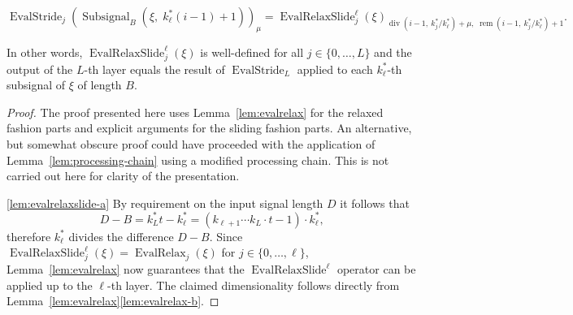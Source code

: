 \documentclass[journal]{IEEEtran}
\newcommand{\ROI}{B}
\newcommand{\discint}[2]{\{#1,\dotsc,#2\}}
\newcommand{\inint}[2]{\in\discint{#1}{#2}}
\DeclareMathOperator{\Subsignal}{Subsignal}
\DeclareMathOperator{\EvalStride}{EvalStride}
\renewcommand{\div}[2]{\operatorname{div}(#1,\ #2)}
\newcommand{\rem}[2]{\operatorname{rem}(#1,\ #2)}
\DeclareMathOperator{\EvalRelax}{EvalRelax}
\DeclareMathOperator{\EvalRelaxSlide}{EvalRelaxSlide}
\begin{document}
\begin{lemma}
\begin{enumerate}
        \begin{displaymath}
          \EvalStride_j(\Subsignal_\ROI(\xi,\; k_\ell^*(i - 1) + 1))_\mu
          = \EvalRelaxSlide_j^\ell(\xi)_{\div{i - 1}{k_j^* / k_\ell^*} + \mu,\;\rem{i - 1}{k_j^* / k_\ell^*} + 1}\text{.}
        \end{displaymath}
\end{enumerate}
In other words, $\EvalRelaxSlide_j^\ell(\xi)$ is well-defined for all $j\inint{0}{L}$ and the output of the $L$-th layer equals the result of $\EvalStride_L$ applied to each $k_\ell^*$-th subsignal of $\xi$ of length $\ROI$.
\end{lemma}\begin{proof}
The proof presented here uses Lemma~\ref{lem:evalrelax} for the relaxed fashion parts and explicit arguments for the sliding fashion parts.
An alternative, but somewhat obscure proof could have proceeded with the application of Lemma~\ref{lem:processing-chain} using a modified processing chain.
This is not carried out here for clarity of the presentation.

\ref{lem:evalrelaxslide-a}
By requirement on the input signal length $D$ it follows that
\begin{displaymath}
  D - \ROI
  = k_L^*t - k_\ell^*
  = (k_{\ell + 1}\cdots k_L\cdot t - 1)\cdot k_\ell^*\text{,}
\end{displaymath}
therefore $k_\ell^*$ divides the difference $D - \ROI$.
Since $\EvalRelaxSlide_j^\ell(\xi) = \EvalRelax_j(\xi)$ for $j\inint{0}{\ell}$, Lemma~\ref{lem:evalrelax} now guarantees that the $\EvalRelaxSlide^\ell$ operator can be applied up to the $\ell$-th layer.
The claimed dimensionality follows directly from Lemma~\ref{lem:evalrelax}\ref{lem:evalrelax-b}.


\end{proof}
\end{document}
